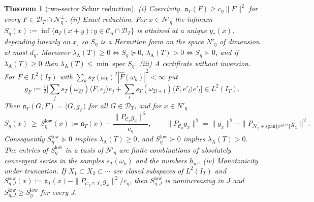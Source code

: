 \documentclass[11pt]{amsart}
\newtheorem{theorem}{Theorem}[section]
\theoremstyle{definition}
\theoremstyle{remark}
\newcommand{\IT}{I_T}
\newcommand{\lamA}{\lambda_{\mathrm A}(T)}
\newcommand{\Fh}{\widehat F}
\begin{document}
\begin{theorem}[two-sector Schur reduction]\label{thm:nyq-schur}
\emph{(i) Coercivity.} $\mathfrak a_T(F)\ge c_\eta\|F\|^2$ for every $F\in\mathcal D_T\cap\mathcal N_\eta^\perp$.
\emph{(ii) Exact reduction.} For $x\in N'_\eta$ the infimum $S_\eta(x):=\inf\{\mathfrak a_T(x+y):y\in\mathcal C_\eta\cap\mathcal D_T\}$ is
attained at a unique $y_*(x)$, depending linearly on $x$, so $S_\eta$ is a Hermitian form on the space $N'_\eta$ of
dimension at most $d_\eta$. Moreover $\lamA\ge0\iff S_\eta\succeq0$, $\lamA>0\iff S_\eta\succ0$, and if $\lamA\ge0$ then
$\lamA\le\min\operatorname{spec}S_\eta$.
\emph{(iii) A certificate without inversion.} For $F\in L^2(\IT)$ with $\sum_ks_T(\omega_k)^2|\Fh(\omega_k)|^2<\infty$ put
\[
g_F:=\tfrac12\Big[\sum_js_T(\omega_{2j})\langle F,e_j\rangle e_j+\sum_ls_T(\omega_{2l+1})\langle F,e'_l\rangle e'_l\Big]\in L^2(\IT).
\]
Then $\mathfrak a_T(G,F)=\langle G,g_F\rangle$ for all $G\in\mathcal D_T$, and for $x\in N'_\eta$
\[
S_\eta(x)\ \ge\ S^{\mathrm{low}}_\eta(x):=\mathfrak a_T(x)-\frac{\|P_{\mathcal C_\eta}g_x\|^2}{c_\eta},\qquad
\|P_{\mathcal C_\eta}g_x\|^2=\|g_x\|^2-\|P_{\mathcal N_\eta+\mathrm{span}\{e^{\pm t/2}\}}g_x\|^2 .
\]
Consequently $S^{\mathrm{low}}_\eta\succeq0$ implies $\lamA\ge0$, and $S^{\mathrm{low}}_\eta\succ0$ implies $\lamA>0$. The
entries of $S^{\mathrm{low}}_\eta$ in a basis of $N'_\eta$ are finite combinations of absolutely convergent series in the
samples $s_T(\omega_k)$ and the numbers $h_m$.
\emph{(iv) Monotonicity under truncation.} If $X_1\subset X_2\subset\cdots$ are closed subspaces of $L^2(\IT)$ and
$S^{\mathrm{low}}_{\eta,J}(x):=\mathfrak a_T(x)-\|P_{\mathcal C_\eta\cap X_J}g_x\|^2/c_\eta$, then $S^{\mathrm{low}}_{\eta,J}$ is
nonincreasing in $J$ and $S^{\mathrm{low}}_{\eta,J}\ge S^{\mathrm{low}}_\eta$ for every $J$.
\end{theorem}
\end{document}
